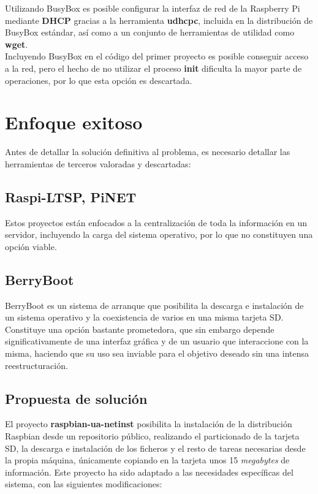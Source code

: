 \documentclass{article}
\begin{document}
Utilizando BusyBox es posible configurar la interfaz de red de la Raspberry Pi mediante \textbf{DHCP} gracias a la herramienta \textbf{udhcpc}, incluida en la distribución de BusyBox estándar, así como a un conjunto de herramientas de utilidad como \textbf{wget}.\\

Incluyendo BusyBox en el código del primer proyecto es posible conseguir acceso a la red, pero el hecho de no utilizar el proceso \textbf{init} dificulta la mayor parte de operaciones, por lo que esta opción es descartada.

\section{Enfoque exitoso}

Antes de detallar la solución definitiva al problema, es necesario detallar las herramientas de terceros valoradas y descartadas:

\subsection*{Raspi-LTSP, PiNET}

Estos proyectos\cite{raspiltsp, pinet} están enfocados a la centralización de toda la información en un servidor, incluyendo la carga del sistema operativo, por lo que no constituyen una opción viable.

\subsection*{BerryBoot}

BerryBoot\cite{berryboot} es un sistema de arranque que posibilita la descarga e instalación de un sistema operativo y la coexistencia de varios en una misma tarjeta SD. Constituye una opción bastante prometedora, que sin embargo depende significativamente de una interfaz gráfica y de un usuario que interaccione con la misma, haciendo que su uso sea inviable para el objetivo deseado sin una intensa reestructuración.

\subsection{Propuesta de solución}

El proyecto \textbf{raspbian-ua-netinst}\cite{raspbian-ua-netinst} posibilita la instalación de la distribución Raspbian desde un repositorio público, realizando el particionado de la tarjeta SD, la descarga e instalación de los ficheros y el resto de tareas necesarias desde la propia máquina, únicamente copiando en la tarjeta unos 15 \textit{megabytes} de información. Este proyecto ha sido adaptado a las necesidades específicas del sistema, con las siguientes modificaciones:
\end{document}
